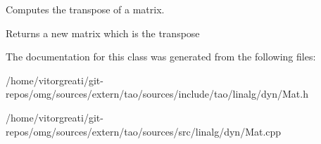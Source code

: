 Computes the transpose of a matrix. 

\begin{DoxyReturn}{Returns}
a new matrix which is the transpose 
\end{DoxyReturn}


The documentation for this class was generated from the following files\+:\begin{DoxyCompactItemize}
\item 
/home/vitorgreati/git-\/repos/omg/sources/extern/tao/sources/include/tao/linalg/dyn/Mat.\+h\item 
/home/vitorgreati/git-\/repos/omg/sources/extern/tao/sources/src/linalg/dyn/Mat.\+cpp\end{DoxyCompactItemize}
